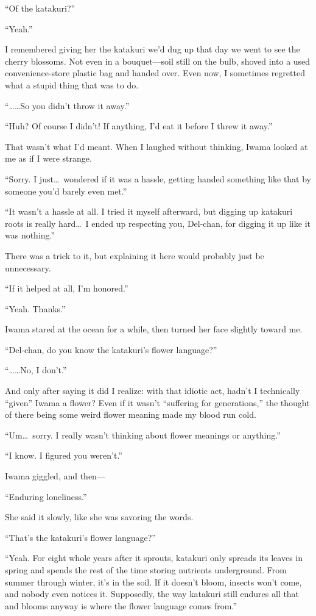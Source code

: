 \documentclass[
    a4paper,
    12pt,
    twoside,
    openany,
    UTF8,
    fontset=windows
]{ctexbook}
\begin{document}
``Of the katakuri?''

``Yeah.''

I remembered giving her the katakuri we'd dug up that day we went to see the cherry blossoms. Not even in a bouquet---soil still on the bulb, shoved into a used convenience-store plastic bag and handed over. Even now, I sometimes regretted what a stupid thing that was to do.

``\dots\dots So you didn't throw it away.''

``Huh? Of course I didn't! If anything, I'd eat it before I threw it away.''

That wasn't what I'd meant. When I laughed without thinking, Iwama looked at me as if I were strange.

``Sorry. I just\dots\ wondered if it was a hassle, getting handed something like that by someone you'd barely even met.''

``It wasn't a hassle at all. I tried it myself afterward, but digging up katakuri roots is really hard\dots\ I ended up respecting you, Del-chan, for digging it up like it was nothing.''

There was a trick to it, but explaining it here would probably just be unnecessary.

``If it helped at all, I'm honored.''

``Yeah. Thanks.''

Iwama stared at the ocean for a while, then turned her face slightly toward me.

``Del-chan, do you know the katakuri's flower language?''

``\dots\dots No, I don't.''

And only after saying it did I realize: with that idiotic act, hadn't I technically ``given'' Iwama a flower? Even if it wasn't ``suffering for generations,'' the thought of there being some weird flower meaning made my blood run cold.

``Um\dots\ sorry. I really wasn't thinking about flower meanings or anything.''

``I know. I figured you weren't.''

Iwama giggled, and then---

``Enduring loneliness.''

She said it slowly, like she was savoring the words.

``That's the katakuri's flower language?''

``Yeah. For eight whole years after it sprouts, katakuri only spreads its leaves in spring and spends the rest of the time storing nutrients underground. From summer through winter, it's in the soil. If it doesn't bloom, insects won't come, and nobody even notices it. Supposedly, the way katakuri still endures all that and blooms anyway is where the flower language comes from.''
\end{document}
